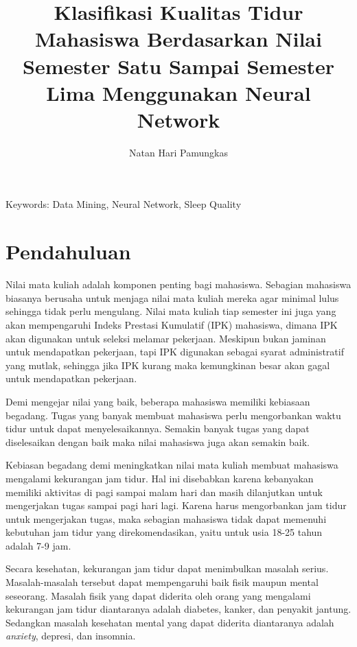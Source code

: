 \documentclass[12pt, a4paper, twoside]{article}
\title{Klasifikasi Kualitas Tidur Mahasiswa Berdasarkan Nilai Semester Satu Sampai Semester Lima Menggunakan Neural Network}
\author{Natan Hari Pamungkas}
\date{}
\begin{document}
\maketitle

\begin{abstract}
\end{abstract}

Keywords: Data Mining, Neural Network, Sleep Quality

\section{Pendahuluan}
\justifying
Nilai mata kuliah adalah komponen penting bagi mahasiswa. Sebagian mahasiswa biasanya berusaha untuk menjaga nilai mata kuliah mereka agar minimal lulus sehingga tidak perlu mengulang. Nilai mata kuliah tiap semester ini juga yang akan mempengaruhi Indeks Prestasi Kumulatif (IPK) mahasiswa, dimana IPK akan digunakan untuk seleksi melamar pekerjaan. Meskipun bukan jaminan untuk mendapatkan pekerjaan, tapi IPK digunakan sebagai syarat administratif yang mutlak, sehingga jika IPK
kurang maka kemungkinan besar akan gagal untuk mendapatkan pekerjaan. \cite{Idris.2020}

Demi mengejar nilai yang baik, beberapa mahasiswa memiliki kebiasaan begadang. Tugas yang banyak membuat mahasiswa perlu mengorbankan waktu tidur untuk dapat menyelesaikannya. Semakin banyak tugas yang dapat diselesaikan dengan baik maka nilai mahasiswa juga akan semakin baik. \cite{Nielton.2019}

Kebiasan begadang demi meningkatkan nilai mata kuliah membuat mahasiswa mengalami kekurangan jam tidur. Hal ini disebabkan karena kebanyakan memiliki aktivitas di pagi sampai malam hari dan masih dilanjutkan untuk mengerjakan tugas sampai pagi hari lagi. Karena harus mengorbankan jam tidur untuk mengerjakan tugas, maka sebagian mahasiswa tidak dapat memenuhi kebutuhan jam tidur yang direkomendasikan, yaitu untuk usia 18-25 tahun adalah 7-9 jam. \cite{Hirshkowitz.2015}

Secara kesehatan, kekurangan jam tidur dapat menimbulkan masalah serius. Masalah-masalah tersebut dapat mempengaruhi baik fisik maupun mental seseorang. Masalah fisik yang dapat diderita oleh orang yang mengalami kekurangan jam tidur diantaranya adalah diabetes, kanker, dan penyakit jantung. Sedangkan masalah kesehatan mental yang dapat diderita diantaranya adalah \textit{anxiety}, depresi, dan insomnia. \cite{Berglund.2019}
\end{document}
